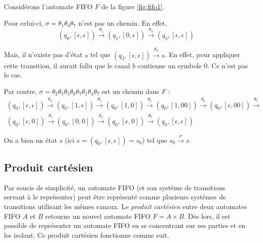 \begin{example}
  Considérons l'automate FIFO $F$ de la figure \ref{fig:fifo1}.

  Pour celui-ci, $\sigma=\theta_1\theta_4\theta_7$ n'est pas un chemin. En effet,
  $$
  (q_0,[\epsilon,\epsilon])\xrightarrow{\theta_1}(q_1,[0,\epsilon])\xrightarrow{\theta_4}(q_3,[\epsilon,\epsilon])
  $$

  Mais, il n'existe pas d'état $s$ tel que $(q_3,[\epsilon,\epsilon])\xrightarrow{\theta_7}s$. En effet, pour appliquer cette transition, il aurait fallu que le canal $b$ contienne un symbole $0$. Ce n'est pas le cas.


  Par contre, $\sigma=\theta_2\theta_5\theta_5\theta_6\theta_7\theta_1\theta_4\theta_7$ est un chemin dans $F$ :
  \begin{equation*}
    \begin{gathered}
      (q_0,[\epsilon,\epsilon])\xrightarrow{\theta_2}
      (q_0,[1,\epsilon])\xrightarrow{\theta_5}
      (q_0,[1,0])\xrightarrow{\theta_5}
      (q_0,[1,00])\xrightarrow{\theta_6}
      (q_0,[\epsilon,00])\xrightarrow{\theta_7}\\
      (q_0,[\epsilon,0])\xrightarrow{\theta_1}
      (q_0,[0,0])\xrightarrow{\theta_4}
      (q_0,[\epsilon,0])\xrightarrow{\theta_7}
      (q_0,[\epsilon,\epsilon])
    \end{gathered}
  \end{equation*}

  On a bien un état $s$ (ici $s=(q_0,[\epsilon,\epsilon])=s_0$) tel que $s_0\xrightarrow{\sigma}s$.

\end{example}

\subsection{Produit cartésien}\label{ss:cartesien}

Par soucis de simplicité, un automate FIFO (et son système de transitions servant à le représenter) peut être représenté comme plusieurs systèmes de transitions utilisant les mêmes canaux. Le \emph{produit cartésien} entre deux automates FIFO $A$ et $B$ retourne un nouvel automate FIFO $F=A \times B$. Dès lors, il est possible de représenter un automate FIFO en se concentrant sur ses parties et en les isolant. Ce produit cartésien fonctionne comme suit.

